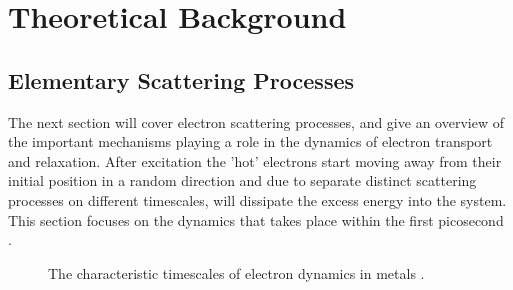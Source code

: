 \documentclass[a4paper,12pt,twoside]{article}
\begin{document}
\newpage



    \section{Theoretical Background}
        \label{TBchap}
                \subsection{Elementary Scattering Processes}
            \label{ESPchap}
The next section will cover electron scattering processes, and give an overview of the important mechanisms playing a role in the dynamics of electron transport and relaxation. After excitation the 'hot' electrons start moving away from their initial position in a random direction
and due to separate distinct scattering processes on different timescales, will dissipate the excess energy into the system. This section focuses on the dynamics that takes place within the first picosecond \cite{Bovensiepen2012}.
	\begin{figure}[H]
		\caption{The characteristic timescales of electron dynamics in metals \cite{Bauer2015}.}
		    \label{timescale}
	\end{figure}
\end{document}
